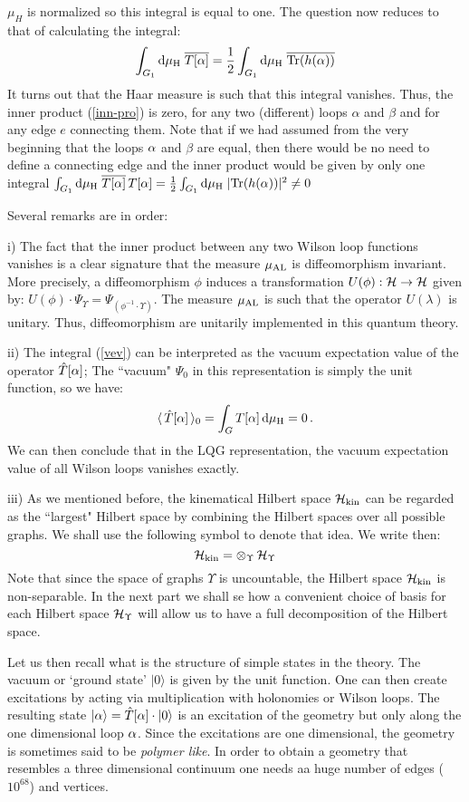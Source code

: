 \documentclass[aps,prd,tightenlines,showpacs,nofootinbib,preprint]{revtex4}
\def\be{\begin{equation}}
\def\ee{\end{equation}}
\def\d{{\rm d}}
\begin{document}
$\mu_H$ is normalized so this integral is equal to one. The
question now reduces to that of calculating the integral:
%
\be \int_{G_1} \d\mu_{\rm
H}\;\overline{T[\a]}=\frac{1}{2}\int_{G_1} \d\mu_{\rm H}\;
\overline{{\rm Tr}(h(\a))}\label{vev} \ee It turns out that the
Haar measure is such that this integral vanishes. Thus, the inner
product (\ref{inn-pro}) is zero, for any two (different) loops
$\alpha$ and $\beta$ and for any edge $e$ connecting them. Note
that if we had assumed from the very beginning that the loops ${\alpha}$
and $\beta$ are equal, then there would be no need to define a
connecting edge and the inner product would be given by only one
integral $ \int_{G_1} \d\mu_{\rm
H}\;\overline{T[\a]}\,T[\a]=\frac{1}{2}\int_{G_1} \d\mu_{\rm H}\;
|{\rm Tr}(h(\a))|^2\neq 0$

Several remarks are in order:

i) The fact that the inner product between any two Wilson loop
functions vanishes is a clear signature that the measure $\mu_{\rm
AL}$ is diffeomorphism invariant. More precisely, a diffeomorphism
$\phi$ induces a transformation $U(\phi):{\cal H}\rightarrow{\cal
H}$ given by:
$U(\phi)\cdot\Psi_\Upsilon=\Psi_{(\phi^{-1}\cdot\Upsilon)}$. The
measure $\mu_{\rm AL}$ is such that the operator $U(\lambda)$ is
unitary. Thus, diffeomorphism are unitarily implemented in this
quantum theory.

ii) The integral (\ref{vev}) can be interpreted as the vacuum
expectation value of the operator $\hat{T}[{\alpha}]$; The ``vacuum"
$\Psi_0$ in this representation is simply the unit function, so we
have:
%
$$
\langle\,\hat{T}[\a]\,\rangle_0=
\int_G T[\a]\,\d\mu_{\rm H}=0\, .
$$
We can then conclude that in the LQG representation, the vacuum
expectation value of all Wilson loops vanishes exactly.

iii) As we mentioned before, the kinematical Hilbert space ${\cal
H}_{\rm kin}$ can be regarded as the ``largest" Hilbert space by
combining the Hilbert spaces over all possible graphs. We shall
use the following symbol to denote that idea. We write then:
%
$$
{\cal H}_{\rm kin}=\otimes_{\Upsilon}\,{\cal H}_\Upsilon
$$
%
Note that since the space of graphs $\Upsilon$ is uncountable, the
Hilbert space ${\cal H}_{\rm kin}$ is non-separable. In the next
part we shall se how a convenient choice of basis for each Hilbert
space ${\cal H}_\Upsilon$ will allow us to have a full
decomposition of the Hilbert space.

Let us then recall what is the structure of simple states in the
theory. The vacuum or `ground state' $|0\rangle$ is given by the
unit function. One can then create excitations by acting via
multiplication with holonomies or Wilson loops. The resulting
state $|{\alpha}\rangle=\hat{T}[{\alpha}]\cdot|0\rangle$ is an excitation of
the geometry but only along the one dimensional loop ${\alpha}$. Since
the excitations are one dimensional, the geometry is sometimes
said to be {\it polymer like}. In order to obtain a geometry that
resembles a three dimensional continuum one needs aa huge number
of edges ($10^68$) and vertices.
\end{document}
